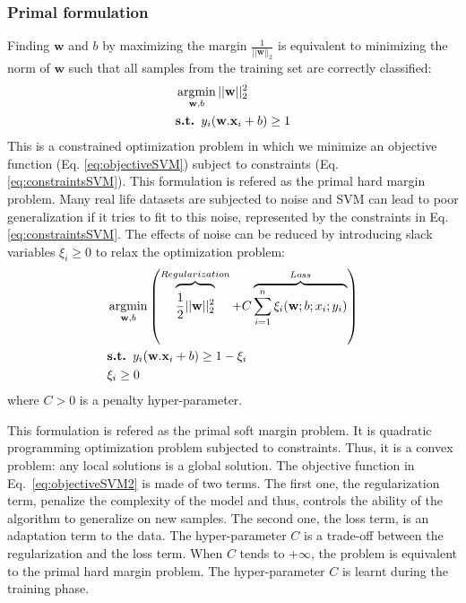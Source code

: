 \subsubsection{Primal formulation}
Finding $\textbf{w}$ and $b$ by maximizing the margin $\frac{1}{||\textbf{w}||_2}$ is equivalent to minimizing the norm of $\textbf{w}$ such that all samples from the training set are correctly classified:
	\begin{align}
		& \argmin_{\textbf{w},b} ||\textbf{w}||_2^2 \label{eq:objectiveSVM}\\
		& \textbf{s.t. } y_i(\textbf{w}.\textbf{x}_i+b) \geq 1 \label{eq:constraintsSVM}
	\end{align}
This is a constrained optimization problem in which we minimize an objective function (Eq. \ref{eq:objectiveSVM}) subject to constraints (Eq. \ref{eq:constraintsSVM}). This formulation is refered as the primal hard margin problem. Many real life datasets are subjected to noise and SVM can lead to poor generalization if it tries to fit to this noise, represented by the constraints in Eq. \ref{eq:constraintsSVM}. The effects of noise can be reduced by introducing slack variables $\xi_i \geq 0$ to relax the optimization problem:
	\begin{align}
	& \argmin_{\textbf{w},b}  
	\left( 
	\overbrace{\vphantom{\sum_{i=1}^n \xi_i}
		\frac{1}{2}||\textbf{w}||^2_2}^{Regularization}
	+ C \overbrace{\sum\limits_{i=1}^{n}\xi_i(\textbf{w}; b; x_i; y_i)}^{Loss} \right) 
	\label{eq:objectiveSVM2}\\
	& \textbf{s.t. } y_i(\textbf{w}.\textbf{x}_i+b) \geq 1 -\xi_i \label{eq:constraintsSVM2} \\
	&  \xi_i \geq 0 \label{eq:constraintsSVM20}
	\end{align}
\noindent where $C > 0$ is a penalty hyper-parameter. 
	
This formulation is refered as the primal soft margin problem. It is quadratic programming optimization problem subjected to constraints. Thus, it is a convex problem: any local solutions is a global solution. The objective function in Eq.~\ref{eq:objectiveSVM2} is made of two terms. The first one, the regularization term, penalize the complexity of the model and thus, controls the ability of the algorithm to generalize on new samples. The second one, the loss term, is an adaptation term to the data. The hyper-parameter $C$ is a trade-off between the regularization and the loss term. When $C$ tends to $+\infty$, the problem is equivalent to the primal hard margin problem. The hyper-parameter $C$ is learnt during the training phase. 

